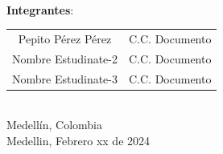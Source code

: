 \begin{titlepage}
\begin{minipage}{13.5cm}
\HRule \\[1.5cm]

{\large \textbf{Integrantes}:\\[0.3cm]

\begin{tabular}{cc}
Pepito Pérez Pérez & C.C. Documento\\
Nombre Estudinate-2 & C.C. Documento\\
Nombre Estudinate-3 & C.C. Documento\\
\end{tabular}
}\\[2.5cm]

{\large
Medellín, Colombia
}\\[0.3cm]

{\large
Medellin, Febrero xx de 2024
}

\end{minipage}

\vfill %

\end{titlepage}



